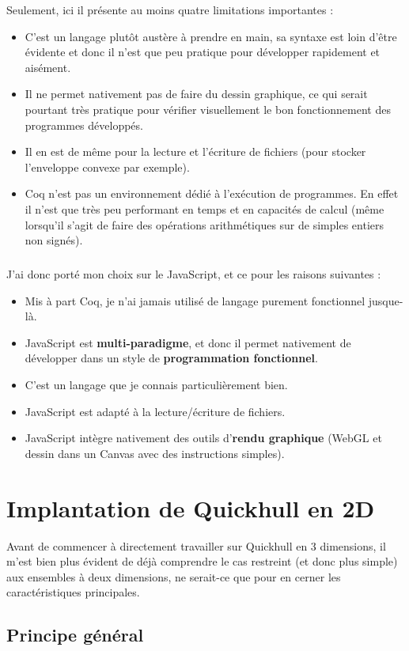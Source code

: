 \documentclass[]{article}
\begin{document}
Seulement, ici il présente au moins quatre limitations importantes :
\begin{itemize}
	\item C'est un langage plutôt austère à prendre en main, sa syntaxe est loin d'être évidente et donc il n'est que peu pratique pour développer rapidement et aisément.
	\item Il ne permet nativement pas de faire du dessin graphique, ce qui serait pourtant très pratique pour vérifier visuellement le bon fonctionnement des programmes développés.
	\item Il en est de même pour la lecture et l'écriture de fichiers (pour stocker l'enveloppe convexe par exemple).
	\item Coq n'est pas un environnement dédié à l'exécution de programmes. En effet il n'est que très peu performant en temps et en capacités de calcul (même lorsqu'il s'agit de faire des opérations arithmétiques sur de simples entiers non signés).
\end{itemize}

\subparagraph{}
J'ai donc porté mon choix sur le JavaScript, et ce pour les raisons suivantes :
\begin{itemize}
	\item Mis à part Coq, je n'ai jamais utilisé de langage purement fonctionnel jusque-là.
	\item JavaScript est \textbf{multi-paradigme}, et donc il permet nativement de développer dans un style de \textbf{programmation fonctionnel}.
	\item C'est un langage que je connais particulièrement bien.
	\item JavaScript est adapté à la lecture/écriture de fichiers.
	\item JavaScript intègre nativement des outils d'\textbf{rendu graphique} (WebGL et dessin dans un Canvas avec des instructions simples).
\end{itemize}

\section{Implantation de Quickhull en 2D}
Avant de commencer à directement travailler sur Quickhull en 3 dimensions, il m'est bien plus évident de déjà comprendre le cas restreint (et donc plus simple) aux ensembles à deux dimensions, ne serait-ce que pour en cerner les caractéristiques principales.

\subsection{Principe général}
\end{document}
